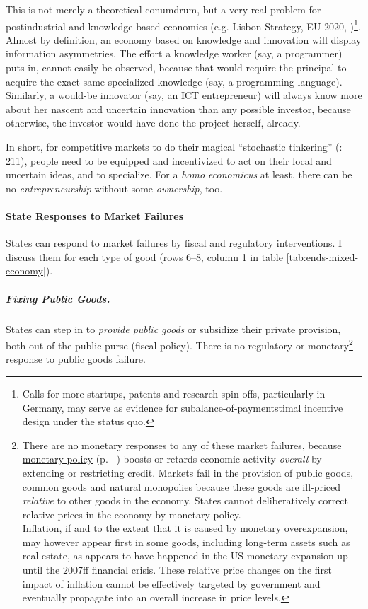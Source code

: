 This is not merely a theoretical conumdrum, but a very real problem for postindustrial  and knowledge-based economies (e.g. Lisbon Strategy, EU 2020, \citealt{Bell-1973-aa})\footnote{
	Calls for more startups, patents and research spin-offs, particularly in Germany, may serve as evidence for subalance-of-paymentstimal incentive design under the status quo.}. 
Almost by definition, an economy based on knowledge and innovation will display information asymmetries. The effort a knowledge worker (say, a programmer) puts in, cannot easily be observed, because that would require the principal to acquire the exact same specialized knowledge (say, a programming language). Similarly, a would-be innovator (say, an \gls{ICT} entrepreneur) will always know more about her nascent and uncertain innovation than any possible investor, because otherwise, the investor would have done the project herself, already. 

In short, for competitive markets to do their magical ``stochastic tinkering'' (\citealt{Taleb2007}: 211), people need to be equipped and incentivized to act on their local and uncertain ideas, and to specialize. For a \emph{homo economicus} at least, there can be no \emph{entrepreneurship} without some \emph{ownership}, too.	

\paragraph{State Responses to Market Failures}  \label{sec:stateresponses} States can respond to market failures by fiscal and regulatory interventions. I discuss them for each type of good (rows 6--8, column 1 in table \ref{tab:ends-mixed-economy}).

\subparagraph{Fixing Public Goods.}  \label{sec:public-good-response} States can step in to \emph{provide public goods} or subsidize their private provision, both out of the public purse (fiscal policy). There is no regulatory or monetary\footnote{
	\label{fn:monetary-commons}There are no monetary responses to any of these market failures, because \hyperref[sec:monetary]{monetary policy} (p.~ \pageref{sec:monetary}) boosts or retards economic activity \emph{overall} by extending or restricting credit. Markets fail in the provision of public goods, common goods and natural monopolies because these goods are ill-priced \emph{relative} to other goods in the economy. States cannot deliberatively correct relative prices in the economy by monetary policy. \\
	Inflation, if and to the extent that it is caused by monetary overexpansion, may however appear first in some goods, including long-term assets such as real estate, as appears to have happened in the US monetary expansion up until the 2007ff financial crisis. These relative price changes on the first impact of inflation cannot be effectively targeted by government and eventually propagate into an overall increase in price levels.} %
response to public goods failure.

